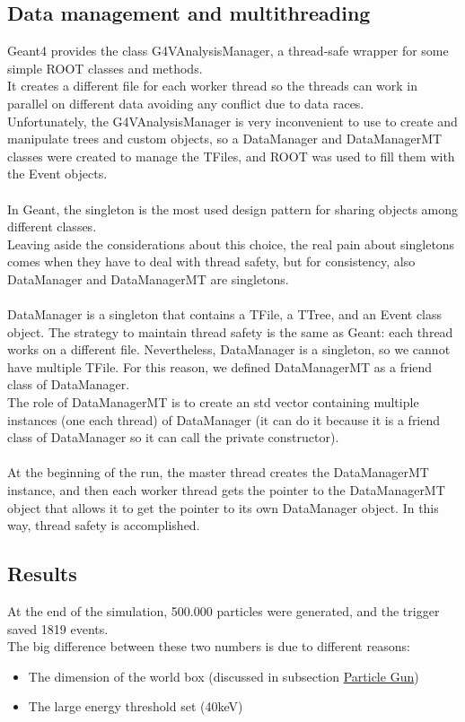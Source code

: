 \documentclass[10pt, a4paper, twocolumn]{article} %
\begin{document}
\subsection{Data management and multithreading}
Geant4 provides the class G4VAnalysisManager, a thread-safe wrapper for some simple ROOT classes and methods.\\
It creates a different file for each worker thread so the threads can work in parallel on different data avoiding any conflict due to data races.
\\
Unfortunately, the G4VAnalysisManager is very inconvenient to use to create and manipulate trees and custom objects, so a DataManager and DataManagerMT classes were created to manage the TFiles, and ROOT was used to fill them with the Event objects.
\\
\\
In Geant, the singleton is the most used design pattern for sharing objects among different classes.
\\
Leaving aside the considerations about this choice, the real pain about singletons comes when they have to deal with thread safety, but for consistency, also DataManager and DataManagerMT are singletons.
\\
\\
DataManager is a singleton that contains a TFile, a TTree, and an Event class object.
The strategy to maintain thread safety is the same as Geant: each thread works on a different file. Nevertheless, DataManager is a singleton, so we cannot have multiple TFile. For this reason, we defined DataManagerMT as a friend class of DataManager.
\\
The role of DataManagerMT is to create an std vector containing multiple instances (one each thread)
 of DataManager (it can do it because it is a friend class of DataManager so it can call the private constructor).
 \\
 \\
 At the beginning of the run, the master thread creates the DataManagerMT instance, and then each worker thread gets the pointer to the DataManagerMT object that allows it to get the pointer to its own DataManager object.
 In this way, thread safety is accomplished.

\subsection{Results}
At the end of the simulation, 500.000 particles were generated, and the trigger saved 1819 events.\\
The big difference between these two numbers is due to different reasons:
\begin{itemize}
    \item The dimension of the world box (discussed in subsection \hyperref[ssec:PG]{Particle Gun})
    \item The large energy threshold set (40keV)
\end{itemize}
\end{document}
